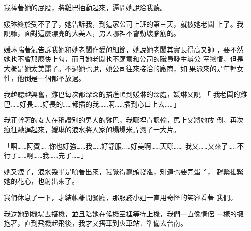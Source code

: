 我捧著她的屁股，將雞巴抽動起來，逼問她說給我聽。

媛琳終於受不了了，她告訴我，到這家公司上班的第三天，就被她老闆
上了。我說嘛，面對這麼漂亮的大美人，男人哪裡不會動壞腦筋的。

媛琳喘著氣告訴我她和她老闆作愛的細節，她說她老闆其實長得高又帥
，要不然她也不會那麼快上勾，而且她老闆也不願意和公司的職員發生辦公
室戀情，但是大概是她太美麗了。不過她也說，她公司往來接洽的廠商，如
果派來的是年輕女性，他倒是一個都不放過。

我越聽越興奮，雞巴每次都深深的插進頂到媛琳的深處，媛琳又說：「
我老闆的雞巴……好長……好長的……都插的我……啊……插到心口上去……」

我正幹著的女人在稱讚別的男人的雞巴，我哪裡肯認輸，馬上又將她放
倒，再次瘋狂馳逞起來，媛琳的浪水將人家的塌塌米弄濕了一大片。

「啊……阿賓……你也好強……我……好舒服……好美啊……天哪……
我又……又來了……不行了……啊……我……完了……」

她又洩了，浪水幾乎是噴著出來，我覺得龜頭發漲，知道也要完蛋了，
趕緊抵緊她的花心，也射出來了。

我們休息了一下，才結帳離開餐廳，那服務小姐一直用奇怪的笑容看著
我們。

我送她到機場去搭機，並且陪她在候機室裡等待上機，我們一直像情侶
一樣的擁抱著，直到飛機起飛後，我才又搭車到火車站，準備去台南。











